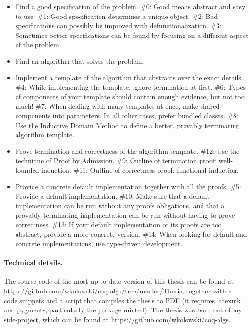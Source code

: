 \documentclass[declaration,mgr,english,shortabstract]{iithesis}
\newcommand{\repo}{\url{https://github.com/wkolowski/coq-algs}}
\newcommand{\thesisrepo}{\url{https://github.com/wkolowski/coq-algs/tree/master/Thesis}}
\begin{document}
\begin{itemize}
    \item Find a good specification of the problem.
    \subitem \#0: Good means abstract and easy to use.
    \subitem \#1: Good specification determines a unique object.
    \subitem \#2: Bad specifications can possibly be improved with defunctionalization.
    \subitem \#3: Sometimes better specifications can be found by focusing on a different aspect of the problem.
    \item Find an algorithm that solves the problem.
    \item Implement a template of the algorithm that abstracts over the exact details.
    \subitem \#4: While implementing the template, ignore termination at first.
    \subitem \#6: Types of components of your template should contain enough evidence, but not too much!
    \subitem \#7: When dealing with many templates at once, make shared components into parameters. In all other cases, prefer bundled classes.
    \subitem \#8: Use the Inductive Domain Method to define a better, provably terminating algorithm template.
    \item Prove termination and correctness of the algorithm template.
    \subitem \#12: Use the technique of Proof by Admission.
    \subitem \#9: Outline of termination proof: well-founded induction.
    \subitem \#11: Outline of correctness proof: functional induction.
    \item Provide a concrete default implementation together with all the proofs.
    \subitem \#5: Provide a default implementation.
    \subitem \#10: Make sure that a default implementation can be run without any proofs obligations, and that a provably terminating implementation can be run without having to prove correctness.
    \subitem \#13: If your default implementation or its proofs are too abstract, provide a more concrete version.
    \subitem \#14: When looking for default and concrete implementations, use type-driven development.
\end{itemize}

\paragraph{Technical details.}{The source code of the most up-to-date version of this thesis can be found at \thesisrepo, together with all code snippets and a script that compiles the thesis to PDF (it requires \href{https://mg.readthedocs.io/latexmk.html}{latexmk} and \href{https://pygments.org/}{pygments}, particularly the package \href{http://tug.ctan.org/tex-archive/macros/latex/contrib/minted/minted.pdf}{minted}). The thesis was born out of my side-project, which can be found at \repo.}
\end{document}
